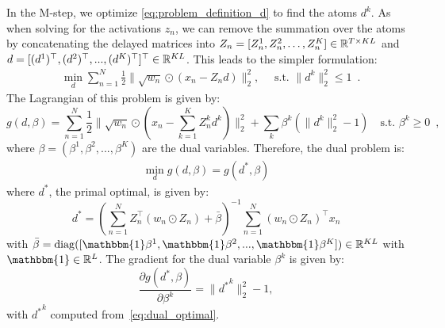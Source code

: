 In the M-step, we optimize \eqref{eq:problem_definition_d} to find the atoms $d^k$.
As when solving for the activations $z_n$, we can remove the summation over the atoms by concatenating the delayed matrices into $Z_{n}=[Z_{n}^1, Z_{n}^2, \dots, Z_{n}^K] \in \mathbb{R}^{T \times KL}$ and $d=[(d^1)^\top, (d^2)^\top, ..., (d^K)^\top]^\top \in \mathbb{R}^{KL}$. This leads to the simpler formulation:
%
\begin{align}
& \min_{d} \sum_{n=1}^{N} \frac{1}{2}\|\sqrt{w_n} \odot (x_{n} - Z_{n}d)\|_{2}^{2}, \quad \text{  s.t.  } \|d^k\|_2^2 \leq 1 \enspace.
\label{eq:subproblem_d}
\end{align}
%
%
 The Lagrangian of this problem is given by:
%
\begin{equation}
g(d, \beta) = \sum_{n=1}^{N} \frac{1}{2}\|\sqrt{w_n} \odot (x_{n} - \sum_{k=1}^{K} Z_{n}^{k}d^{k}) \|_{2}^{2} + \sum_k \beta^k (\|d^k\|_2^{2} - 1) \quad \text{s.t. } \beta^k \geq 0 \enspace,
\end{equation}
%
where $\beta = (\beta^1, \beta^2, ..., \beta^K)$ are the dual variables. Therefore, the dual problem is:
%
\begin{align}
\min_{d}{g(d, \beta)} = g(d^{*}, \beta)
\end{align}
%
where $d^*$, the primal optimal, is given by:
%
\begin{equation}
d^{*} = (\sum_{n=1}^N Z_n^{\top}(w_{n} \odot Z_n) + \bar{\beta} )^{-1}\sum_{n=1}^{N}(w_{n} \odot Z_n)^{\top}x_n
\label{eq:dual_optimal}
\end{equation}
%
with $\bar{\beta} = \mathrm{diag}([\mathbbm{1}\beta^1, \mathbbm{1}\beta^2, ..., \mathbbm{1}\beta^K]) \in \bbR^{KL}$ with $\mathbbm{1} \in \bbR^{L}$. The gradient for the dual variable $\beta^k$ is given by:
%
\begin{equation}
\frac{\partial g(d^{*}, \beta)}{\partial \beta^k}  = \|{d^{*}}^k\|_2^2 - 1,
\end{equation}
%
with ${d^{*}}^k$ computed from~\eqref{eq:dual_optimal}.
